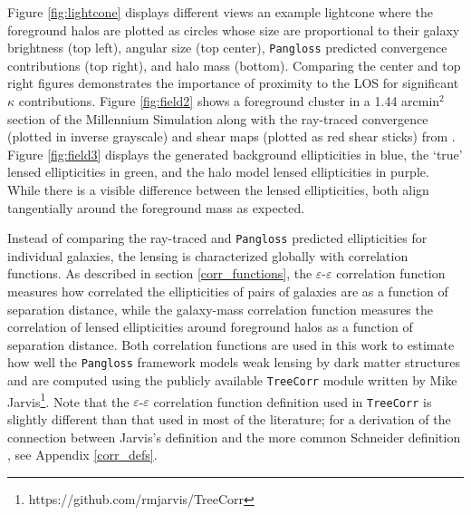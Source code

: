 \documentclass[%
 reprint,
 amsmath,amssymb,
 aps,nofootinbib
]{revtex4-1}
\begin{document}
Figure \ref{fig:lightcone} displays different views an example lightcone where the foreground halos are plotted as circles whose size are proportional to their galaxy brightness (top left), angular size (top center), \texttt{Pangloss} predicted convergence contributions (top right), and halo mass (bottom). Comparing the center and top right figures demonstrates the importance of proximity to the LOS for significant $\kappa$ contributions. Figure \ref{fig:field2} shows a foreground cluster in a 1.44 arcmin$^2$ section of the Millennium Simulation along with the ray-traced convergence (plotted in inverse grayscale) and shear maps (plotted as red shear sticks) from \cite{ray_tracing}. Figure \ref{fig:field3} displays the generated background ellipticities in blue, the `true' lensed ellipticities in green, and the halo model lensed ellipticities in purple. While there is a visible difference between the lensed ellipticities, both align tangentially around the foreground mass as expected.

Instead of comparing the ray-traced and \texttt{Pangloss} predicted ellipticities for individual galaxies, the lensing is characterized globally with correlation functions. As described in section \ref{corr_functions}, the $\varepsilon$-$\varepsilon$ correlation function measures how correlated the ellipticities of pairs of galaxies are as a function of separation distance, while the galaxy-mass correlation function measures the correlation of lensed ellipticities around foreground halos as a function of separation distance. Both correlation functions are used in this work to estimate how well the \texttt{Pangloss} framework models weak lensing by dark matter structures and are computed using the publicly available \texttt{TreeCorr} module written by Mike Jarvis\footnote{https://github.com/rmjarvis/TreeCorr}. Note that the $\varepsilon$-$\varepsilon$ correlation function definition used in \texttt{TreeCorr} is slightly different than that used in most of the literature; for a derivation of the connection between Jarvis's definition \cite{jarvis} and the more common Schneider definition \cite{schneider}, see Appendix \ref{corr_defs}.
\end{document}
